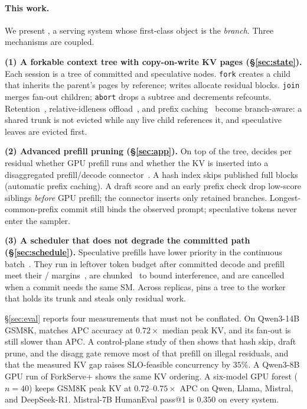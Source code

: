 \paragraph{This work.}
We present \sys, a serving system whose first-class object is the \emph{branch}.
Three mechanisms are coupled.

\smallskip\noindent\textbf{(1) A forkable context tree with copy-on-write KV pages (\S\ref{sec:state}).}
Each session is a tree of committed and speculative nodes.
\texttt{fork} creates a child that inherits the parent's pages by reference; writes allocate residual blocks.
\texttt{join} merges fan-out children; \texttt{abort} drops a subtree and decrements refcounts.
Retention~\cite{continuum}, relative-idleness offload~\cite{mori}, and prefix caching~\cite{sglang,vllm} become branch-aware: a shared trunk is not evicted while any live child references it, and speculative leaves are evicted first.

\smallskip\noindent\textbf{(2) Advanced prefill pruning (\S\ref{sec:app}).}
On top of the tree, \app decides per residual whether GPU prefill runs and whether the KV is inserted into a disaggregated prefill/decode connector~\cite{distserve,splitwise}.
A hash index skips published full blocks (automatic prefix caching).
A draft score and an early prefix check drop low-score siblings \emph{before} GPU prefill; the connector inserts only retained branches.
Longest-common-prefix commit still binds the observed prompt; speculative tokens never enter the sampler.

\smallskip\noindent\textbf{(3) A scheduler that does not degrade the committed path (\S\ref{sec:schedule}).}
Speculative prefills have lower priority in the continuous batch~\cite{orca,sarathi}.
They run in leftover token budget after committed decode and prefill meet their \tbt{}/\ttft{} margins~\cite{jitserve}, are chunked~\cite{sarathisplit} to bound interference, and are cancelled when a commit needs the same SM.
Across replicas, \sys pins a tree to the worker that holds its trunk and steals only residual work.

\S\ref{sec:eval} reports four measurements that must not be conflated.
On Qwen3-14B GSM8K, \sys matches APC accuracy at $0.72\times$ median peak KV, and its fan-out is still slower than APC.
A control-plane study of \app then shows that hash skip, draft prune, and the disagg gate remove most of that prefill on illegal residuals, and that the measured KV gap raises SLO-feasible concurrency by $35\%$.
A Qwen3-8B GPU run of ForkServe+ shows the same KV ordering.
A six-model GPU forest ($n{=}40$) keeps GSM8K peak KV at $0.72$--$0.75\times$ APC on Qwen, Llama, Mistral, and DeepSeek-R1.
Mistral-7B HumanEval pass@1 is $0.350$ on every system.
